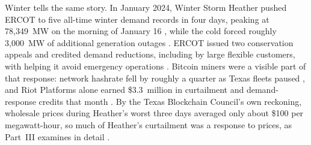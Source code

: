 Winter tells the same story. In January 2024, Winter Storm Heather pushed ERCOT to five all-time winter demand records in four days, peaking at 78,349~MW on the morning of January 16 \autocite{ERCOTPeakRecords2024}, while the cold forced roughly 3,000~MW of additional generation outages \autocite{ERCOTMonthlyJan2024}. %
ERCOT issued two conservation appeals and credited demand reductions, including by large flexible customers, with helping it avoid emergency operations \autocite{ERCOTConservation2024}. Bitcoin miners were a visible part of that response: network hashrate fell by roughly a quarter as Texas fleets paused \autocite{Hunt2024Hashrate}, and Riot Platforms alone earned \$3.3~million in curtailment and demand-response credits that month \autocite{Riot2024Jan}.
By the Texas Blockchain Council's own reckoning, wholesale prices during Heather's worst three days averaged only about \$100 per megawatt-hour, so much of Heather's curtailment was a response to prices, as Part~III examines in detail \autocite{Bratcher2024Data}. %
